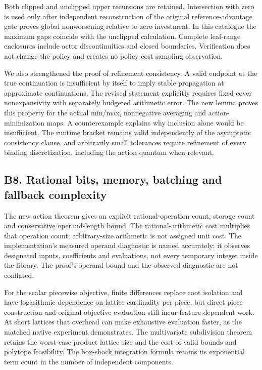 Both clipped and unclipped upper recursions are retained. Intersection
with zero is used only after independent reconstruction of the original
reference-advantage gate proves global nonworsening relative to zero
investment. In this catalogue the maximum gaps coincide with the
unclipped calculation. Complete leaf-range enclosures include actor
discontinuities and closed boundaries. Verification does not change the
policy and creates no policy-cost sampling observation.

We also strengthened the proof of refinement consistency. A valid
endpoint at the true continuation is insufficient by itself to imply
stable propagation at approximate continuations. The revised statement
explicitly requires fixed-cover nonexpansivity with separately budgeted
arithmetic error. The new lemma proves this property for the actual
min/max, nonnegative averaging and action-minimization maps. A
counterexample explains why inclusion alone would be insufficient. The
runtime bracket remains valid independently of the asymptotic
consistency clause, and arbitrarily small tolerances require refinement
of every binding discretization, including the action quantum when
relevant.

\hypertarget{b8.-rational-bits-memory-batching-and-fallback-complexity}{%
\subsection{B8. Rational bits, memory, batching and fallback
complexity}\label{b8.-rational-bits-memory-batching-and-fallback-complexity}}

The new action theorem gives an explicit rational-operation count,
storage count and conservative operand-length bound. The
rational-arithmetic cost multiplies that operation count; arbitrary-size
arithmetic is not assigned unit cost. The implementation's measured
operand diagnostic is named accurately: it observes designated inputs,
coefficients and evaluations, not every temporary integer inside the
library. The proof's operand bound and the observed diagnostic are not
conflated.

For the scalar piecewise objective, finite differences replace root
isolation and have logarithmic dependence on lattice cardinality per
piece, but direct piece construction and original objective evaluation
still incur feature-dependent work. At short lattices that overhead can
make exhaustive evaluation faster, as the matched native experiment
demonstrates. The multivariate subdivision theorem retains the
worst-case product lattice size and the cost of valid bounds and
polytope feasibility. The box-shock integration formula retains its
exponential term count in the number of independent components.

